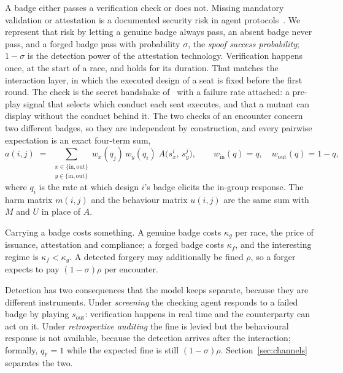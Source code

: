 \documentclass[11pt,a4paper]{article}
\theoremstyle{definition}
\begin{document}
A badge either passes a verification check or does not. Missing mandatory
validation or attestation is a documented security risk in agent
protocols~\citep{anbiaee2026threatmodeling}. We represent that risk by letting a
genuine badge always pass, an absent badge never pass, and a forged badge pass
with probability $\sigma$, the \emph{spoof success probability}; $1 - \sigma$
is the detection power of the attestation technology. Verification happens once, at
the start of a race, and holds for its duration. That matches the interaction
layer, in which the executed design of a seat is fixed before the first round.
The check is the secret handshake of~\citet{robson1990efficiency} with a failure
rate attached: a pre-play signal that selects which conduct each seat executes,
and that a mutant can display without the conduct behind it.
The two checks of an encounter concern two different badges, so they are
independent by construction, and every pairwise expectation is an exact
four-term sum,
\begin{equation}
\label{eq:handshake}
a(i, j) \;=\; \sum_{\substack{x \in \{\mathrm{in}, \mathrm{out}\} \\
                              y \in \{\mathrm{in}, \mathrm{out}\}}}
  w_x(q_j)\, w_y(q_i)\; A\big(s^{i}_{x},\, s^{j}_{y}\big),
\qquad
w_{\mathrm{in}}(q) = q, \quad w_{\mathrm{out}}(q) = 1 - q,
\end{equation}
where $q_i$ is the rate at which design $i$'s badge elicits the in-group
response. The harm matrix $m(i,j)$ and the behaviour matrix $u(i,j)$ are the
same sum with $M$ and $U$ in place of $A$.

Carrying a badge costs something. A genuine badge costs $\kappa_g$ per race,
the price of issuance, attestation and compliance; a forged badge costs
$\kappa_f$, and the interesting regime is $\kappa_f < \kappa_g$. A detected
forgery may additionally be fined $\rho$, so a forger expects to pay
$(1 - \sigma)\rho$ per encounter.

Detection has two consequences that the model keeps separate, because they are
different instruments. Under \emph{screening} the checking agent responds to a
failed badge by playing $s_{\mathrm{out}}$: verification happens in real time
and the counterparty can act on it. Under \emph{retrospective auditing} the
fine is levied but the behavioural response is not available, because the
detection arrives after the interaction; formally, $q_{\mathsf{F}} = 1$ while
the expected fine is still $(1 - \sigma)\rho$. Section~\ref{sec:channels}
separates the two.
\end{document}
